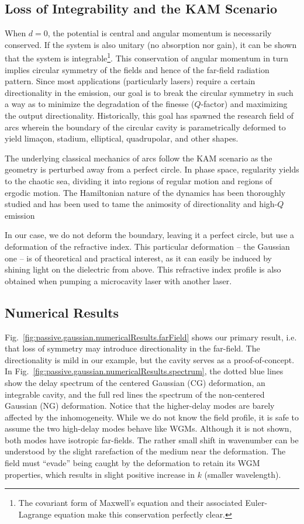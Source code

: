 \subsection{Loss of Integrability and the KAM Scenario}
When $d=0$, the potential is central and angular momentum is 
necessarily conserved. If the system is also unitary
(no absorption nor gain), it can be shown that the system is
integrable\footnote{The covariant form of Maxwell's equation and their
associated Euler-Lagrange equation make this conservation perfectly clear.}. 
This conservation of angular momentum in turn
implies circular symmetry of the fields and hence of the 
far-field radiation pattern. Since most applications (particularly lasers)
require a certain directionality in the emission, our goal is to break 
the circular symmetry in such a way as to minimize the degradation of the
finesse ($Q$-factor) and maximizing the output directionality. Historically, 
this goal has spawned the research field of \glspl{arc} wherein the boundary
of the circular cavity is parametrically deformed to yield limaçon, stadium, 
elliptical, quadrupolar, and other shapes. 

The underlying classical mechanics of \glspl{arc} follow the KAM scenario 
as the geometry is perturbed away from a perfect circle. In phase space, 
regularity yields to the chaotic sea, dividing it into regions of regular
motion and regions of ergodic motion. The Hamiltonian nature of the 
dynamics has been thoroughly studied and has been used to tame the 
animosity of directionality and high-$Q$ emission \cite{KWA2013,KIM2013}

In our case, we do not deform the boundary, leaving it a perfect circle, 
but use a deformation of the refractive index. This particular deformation
-- the Gaussian one -- 
is of theoretical and practical interest, as it can easily be induced
by shining light on the dielectric from above. This refractive
index profile is also obtained when pumping a microcavity laser
with another laser.

\subsection{Numerical Results}
Fig.~\ref{fig:passive.gaussian.numericalResults.farField} shows our primary
result, i.e. that loss of symmetry may introduce directionality
in the far-field. The directionality is mild in our example, but the 
cavity serves as a proof-of-concept. In Fig.~\ref{fig:passive.gaussian.numericalResults.spectrum}, 
the dotted blue lines show the delay spectrum of the centered Gaussian (CG) deformation, 
an integrable cavity, and the full red lines the spectrum of the non-centered Gaussian
(NG) deformation. Notice that the higher-delay modes are barely affected by 
the inhomogeneity. While we do not know the field profile, 
it is safe to assume the two high-delay modes behave like WGMs. Although it is not shown, 
both modes have isotropic far-fields. The rather small shift in wavenumber can be
understood by the slight rarefaction of the medium near the deformation. 
The field must ``evade'' being caught by the deformation to retain
its WGM properties, which results in slight positive increase in $k$ (smaller wavelength). 


